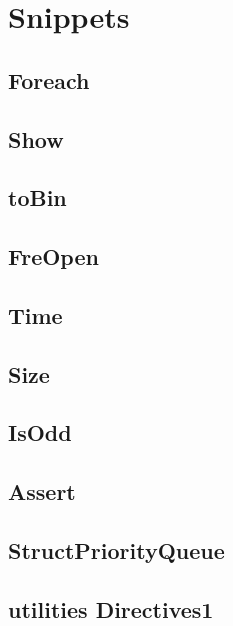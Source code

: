 \section{Snippets}
\subsection{ Foreach}
\raggedbottom
\hrulefill
\subsection{ Show}
\raggedbottom
\hrulefill
\subsection{ toBin}
\raggedbottom
\hrulefill
\subsection{ FreOpen}
\raggedbottom
\hrulefill
\subsection{ Time}
\raggedbottom
\hrulefill
\subsection{ Size}
\raggedbottom
\hrulefill
\subsection{ IsOdd}
\raggedbottom
\hrulefill
\subsection{ Assert}
\raggedbottom
\hrulefill
\subsection{ StructPriorityQueue}
\raggedbottom
\hrulefill
\subsection{utilities Directives1}
\raggedbottom
\hrulefill
